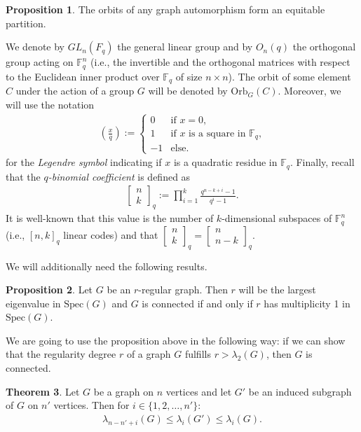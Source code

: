 \documentclass[11pt]{article}
\theoremstyle{definition}
\newtheorem{theorem}{Theorem}[section]
\newtheorem{proposition}[theorem]{Proposition}
\newcommand{\F}{\mathbb{F}}
\newcommand{\Leg}[2]{\left(\frac{#1}{#2}\right)}                       %
\newcommand{\Orb}{\mathrm{Orb}}
\newcommand{\Qbinom}[3]{{\begin{bmatrix} #1 \\ #2 \end{bmatrix}}_{#3}} %
\newcommand{\Spec}{\mathrm{Spec}}
\newcommand{\GL}{GL}
\begin{document}
\begin{proposition}\cite{GR13}\label{prop:equitable}
	The orbits of any graph automorphism form an equitable partition.
\end{proposition}

We denote by $\GL_n(F_q)$ the general linear group and by $O_n(q)$ the orthogonal group acting on $\F_q^n$ (i.e., the invertible and the orthogonal matrices with respect to the Euclidean inner product over $\F_q$ of size $n \times n$).
The orbit of some element $C$ under the action of a group $G$ will be denoted by $\Orb_{G}(C)$.
Moreover, we will use the notation 
\begin{align*}
	\Leg{x}{q} := \begin{cases}
		 0 &\text{if $x = 0$,} \\
		 1 &\text{if $x$ is a square in $\F_q$,} \\
		-1 &\text{else.}
	\end{cases}
\end{align*}
for the \emph{Legendre symbol} indicating if $x$ is a quadratic residue in $\F_q$.
Finally, recall that the \emph{$q$-binomial coefficient} is defined as
\begin{align*}
	\Qbinom{n}{k}{q} := \prod_{i = 1}^k \frac{q^{n - k + i} - 1}{q^i - 1}.
\end{align*}
It is well-known that this value is the number of $k$-dimensional subspaces of $\F_q^n$ (i.e., ${[n, k]}_q$ linear codes) and that $\Qbinom{n}{k}{q} = \Qbinom{n}{n - k}{q}$.

We will additionally need the following results.

\begin{proposition}\cite{DSV45}\label{prop:spec-connect}
	Let $G$ be an $r$-regular graph.
	Then $r$ will be the largest eigenvalue in $\Spec(G)$ and $G$ is connected if and only if $r$ has multiplicity 1 in $\Spec(G)$.
\end{proposition}

We are going to use the proposition above in the following way: if we can show that the regularity degree $r$ of a graph $G$ fulfills $r>\lambda_2(G)$, then $G$ is connected. 

\begin{theorem}\cite{GR13}\label{thm:interlacing}
	Let $G$ be a graph on $n$ vertices and let $G'$ be an induced subgraph of $G$ on $n'$ vertices.
	Then for $i \in \{1, 2, \ldots, n'\}$:
	\begin{align*}
		\lambda_{n - n' + i}(G) \leq \lambda_i(G') \leq \lambda_i(G).
	\end{align*}
\end{theorem}
\end{document}
